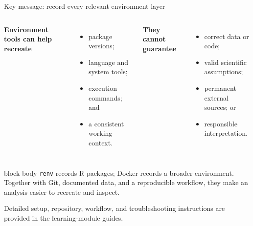 \documentclass[10pt,aspectratio=169]{beamer}
\begin{document}
\begin{frame}{Key message: record every relevant environment layer}

\small

\begin{columns}[T]


\textbf{Environment tools can help recreate}

\begin{itemize}
  \item package versions;
  \item language and system tools;
  \item execution commands; and
  \item a consistent working context.
\end{itemize}


\textbf{They cannot guarantee}

\begin{itemize}
  \item correct data or code;
  \item valid scientific assumptions;
  \item permanent external sources; or
  \item responsible interpretation.
\end{itemize}

\end{columns}

\vspace{0.25cm}

\begin{beamercolorbox}[rounded=true,sep=8pt]{block body}
\texttt{renv} records R packages; Docker records a broader environment. Together with Git, documented data, and a reproducible workflow, they make an analysis easier to recreate and inspect.
\end{beamercolorbox}

\vspace{0.10cm}


\small
\centering

Detailed setup, repository, workflow, and troubleshooting instructions are provided in the learning-module guides.

\end{frame}
\end{document}
